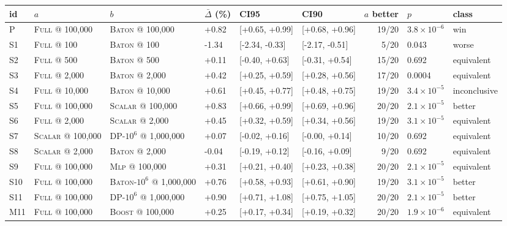 \begin{tabular}{llllllrll}
\toprule
id & $a$ & $b$ & $\bar\Delta$ (\%) & CI95 & CI90 & $a$ better & $p$ & class \\
\midrule
P & \textsc{Full} @ 100{,}000 & \textsc{Baton} @ 100{,}000 & +0.82 & [+0.65, +0.99] & [+0.68, +0.96] & 19/20 & $3.8\times10^{-6}$ & win \\
S1 & \textsc{Full} @ 100 & \textsc{Baton} @ 100 & -1.34 & [-2.34, -0.33] & [-2.17, -0.51] & 5/20 & 0.043 & worse \\
S2 & \textsc{Full} @ 500 & \textsc{Baton} @ 500 & +0.11 & [-0.40, +0.63] & [-0.31, +0.54] & 15/20 & 0.692 & equivalent \\
S3 & \textsc{Full} @ 2{,}000 & \textsc{Baton} @ 2{,}000 & +0.42 & [+0.25, +0.59] & [+0.28, +0.56] & 17/20 & 0.0004 & equivalent \\
S4 & \textsc{Full} @ 10{,}000 & \textsc{Baton} @ 10{,}000 & +0.61 & [+0.45, +0.77] & [+0.48, +0.75] & 19/20 & $3.4\times10^{-5}$ & inconclusive \\
S5 & \textsc{Full} @ 100{,}000 & \textsc{Scalar} @ 100{,}000 & +0.83 & [+0.66, +0.99] & [+0.69, +0.96] & 20/20 & $2.1\times10^{-5}$ & better \\
S6 & \textsc{Full} @ 2{,}000 & \textsc{Scalar} @ 2{,}000 & +0.45 & [+0.32, +0.59] & [+0.34, +0.56] & 19/20 & $3.1\times10^{-5}$ & equivalent \\
S7 & \textsc{Scalar} @ 100{,}000 & DP-$10^6$ @ 1{,}000{,}000 & +0.07 & [-0.02, +0.16] & [-0.00, +0.14] & 10/20 & 0.692 & equivalent \\
S8 & \textsc{Scalar} @ 2{,}000 & \textsc{Baton} @ 2{,}000 & -0.04 & [-0.19, +0.12] & [-0.16, +0.09] & 9/20 & 0.692 & equivalent \\
S9 & \textsc{Full} @ 100{,}000 & \textsc{Mlp} @ 100{,}000 & +0.31 & [+0.21, +0.40] & [+0.23, +0.38] & 20/20 & $2.1\times10^{-5}$ & equivalent \\
S10 & \textsc{Full} @ 100{,}000 & \textsc{Baton}-$10^6$ @ 1{,}000{,}000 & +0.76 & [+0.58, +0.93] & [+0.61, +0.90] & 19/20 & $3.1\times10^{-5}$ & better \\
S11 & \textsc{Full} @ 100{,}000 & DP-$10^6$ @ 1{,}000{,}000 & +0.90 & [+0.71, +1.08] & [+0.75, +1.05] & 20/20 & $2.1\times10^{-5}$ & better \\
M11 & \textsc{Full} @ 100{,}000 & \textsc{Boost} @ 100{,}000 & +0.25 & [+0.17, +0.34] & [+0.19, +0.32] & 20/20 & $1.9\times10^{-6}$ & equivalent \\
\bottomrule
\end{tabular}

